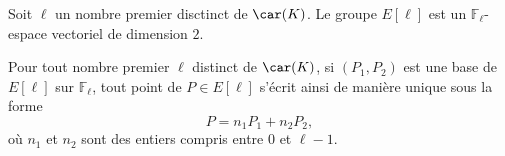 
\begin{corollaire}
    Soit $\ell$ un nombre premier disctinct de $\car(K)$. Le groupe $E[\ell]$ est un $\mathbb{F}_{\ell}$-espace vectoriel de dimension $2$.

    Pour tout nombre premier $\ell$ distinct de $\car(K)$, si $\left( P_1,P_2 \right) $ est une base de $E[\ell]$ sur $\mathbb{F}_{\ell}$, tout point de $P \in E[\ell]$ s'écrit ainsi de manière unique sous la forme
    \[
    P=n_1P_1+n_2P_2
    ,\] 
    où $n_1$ et $n_2$ sont des entiers compris entre $0$ et $\ell-1$.
\end{corollaire}

\begin{demonstration}
    
\end{demonstration}
